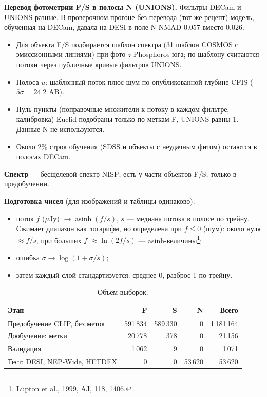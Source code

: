 \documentclass[11pt,a4paper]{article}
\begin{document}
\textbf{Перевод фотометрии F/S в полосы N (UNIONS).} Фильтры DECam и UNIONS разные. В проверочном прогоне без перевода (тот же рецепт) модель, обученная на DECam, давала на DESI в поле N NMAD 0.057 вместо 0.026.
\begin{itemize}
  \item Для объекта F/S подбирается шаблон спектра (31 шаблон COSMOS с эмиссионными линиями) при фото-$z$ Phosphoros юга; по шаблону считаются потоки через публичные кривые фильтров UNIONS.
  \item Полоса $u$: шаблонный поток плюс шум по опубликованной глубине CFIS ($5\sigma=24.2$ AB).
  \item Нуль-пункты (поправочные множители к потоку в каждом фильтре, калибровка) Euclid подобраны только по меткам F, UNIONS равны 1. Данные N не используются.
  \item Около 2\% строк обучения (SDSS и объекты с неудачным фитом) остаются в полосах DECam.
\end{itemize}

\textbf{Спектр} — бесщелевой спектр NISP; есть у части объектов F/S; только в предобучении.

\textbf{Подготовка чисел} (для изображений и таблицы одинаково):
\begin{itemize}
  \item поток $f$ ($\mu$Jy) $\to\operatorname{asinh}(f/s)$, $s$ — медиана потока в полосе по трейну. Сжимает диапазон как логарифм, но определена при $f\le0$ (шум): около нуля $\approx f/s$, при больших $f$ $\approx\ln(2f/s)$ — asinh-величины\footnote{\label{fn:lupton}Lupton et al., 1999, AJ, 118, 1406.};
  \item ошибка $\sigma\to\log(1+\sigma/s)$;
  \item затем каждый слой стандартизуется: среднее 0, разброс 1 по трейну.
\end{itemize}

\begin{table}[H]
\centering\small
\caption{Объём выборок.}
\begin{tabular}{lrrrr}
\toprule
Этап & F & S & N & Всего \\
\midrule
Предобучение CLIP, без меток & 591\,834 & 589\,330 & 0 & 1\,181\,164 \\
Дообучение: метки & 20\,778 & 378 & 0 & 21\,156 \\
Валидация & 1\,062 & 9 & 0 & 1\,071 \\
Тест: DESI, NEP-Wide, HETDEX & 0 & 0 & 53\,620 & 53\,620 \\
\bottomrule
\end{tabular}
\end{table}
\end{document}
